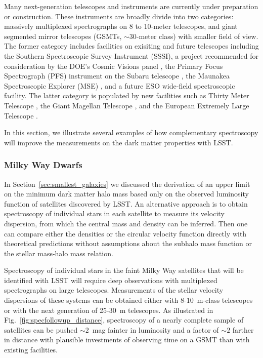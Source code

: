 Many next-generation telescopes and instruments are currently under preparation or construction. These instruments are broadly divide into two categories: massively multiplexed spectrographs on 8 to 10-meter telescopes, and giant segmented mirror telescopes (GSMTs, $\sim30$-meter class) with smaller field of view. The former category includes facilities on exisiting and future telescopes including the Southern Spectroscopic Survey Instrument (SSSI), a project recommended for consideration by the DOE’s Cosmic Visions panel \citep{1604.07626, 1604.07821}, the Primary Focus Spectrograph (PFS) instrument on the Subaru telescope \citep{2014PASJ...66R...1T}, the Maunakea Spectroscopic Explorer (MSE) \citep{1810.08695}, and a future ESO wide-field spectroscopic facility. 
The latter category is populated by new facilities such as Thirty Meter Telescope \citep[TMT;][]{1505.01195}, the Giant Magellan Telescope \citep[GMT;][]{GMT:2018}, and the European Extremely Large Telescope \citep[E-ELT;][]{EELT:2010}. 

In this section, we illustrate several examples of how complementary spectroscopy will improve the measurements on the dark matter properties with LSST.

\subsubsection{Milky Way Dwarfs }
In Section~\ref{sec:smallest_galaxies} we discussed the derivation of an upper limit on the minimum dark matter halo mass based only on the observed luminosity function of satellites discovered by LSST.  An alternative approach is to obtain spectroscopy of individual stars in each satellite to measure its velocity dispersion, from which the central mass and density can be inferred.  Then one can compare either the densities or the circular velocity function directly with theoretical predictions without assumptions about the subhalo mass function or the stellar mass-halo mass relation.

Spectroscopy of individual stars in the faint Milky Way satellites that will be identified with LSST will require deep observations with multiplexed spectrographs on large telescopes.  Measurements of the stellar velocity dispersions of these systems can be obtained either with 8-10~m-class telescopes or with the next generation of 25-30~m telescopes.  As illustrated in Fig.~\ref{fig:specfollowup_distance}, spectroscopy of a nearly complete sample of satellites can be pushed $\sim2$~mag fainter in luminosity and a factor of $\sim2$ farther in distance with plausible investments of observing time on a GSMT than with existing facilities.

